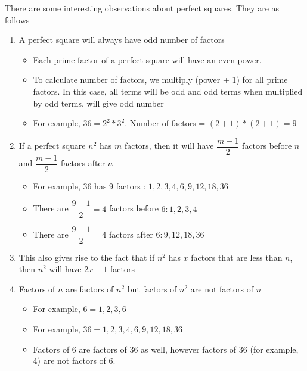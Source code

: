 There are some interesting observations about perfect squares. They are as follows

\begin{enumerate}
    \item A perfect square will always have odd number of factors
    \begin{itemize}
        \item Each prime factor of a perfect square will have an even power. 
        \item To calculate number of factors, we multiply (power + 1) for all prime factors. In this case, all terms will be odd and odd terms when multiplied by odd terms, will give odd number
        \item For example, $36 = 2^2 * 3^2$. Number of factors = $(2+1) * (2+1) = 9$
    \end{itemize}

    \item If a perfect square $n^2$ has $m$ factors, then it will have $\dfrac{m-1}{2}$ factors before $n$ and $\dfrac{m-1}{2}$ factors after $n$
    \begin{itemize}
        \item For example, 36 has 9 factors : $1,2,3,4,6,9,12,18,36$
        \item There are $\dfrac{9-1}{2} = 4$ factors before $6 : 1,2,3,4$
        \item There are $\dfrac{9-1}{2} = 4$ factors after $6 : 9,12,18,36$
    \end{itemize}
    
    \item This also gives rise to the fact that if $n^2$ has $x$ factors that are less than $n$, then $n^2$ will have $2x + 1$ factors

    \item Factors of $n$ are factors of $n^2$ but factors of $n^2$ are not factors of $n$
    \begin{itemize}
        \item For example, $6 = 1,2,3,6$
        \item For example, $36 = 1,2,3,4,6,9,12,18,36$
        \item Factors of 6 are factors of 36 as well, however factors of 36 (for example, 4) are not factors of 6. 
    \end{itemize}
\end{enumerate}


